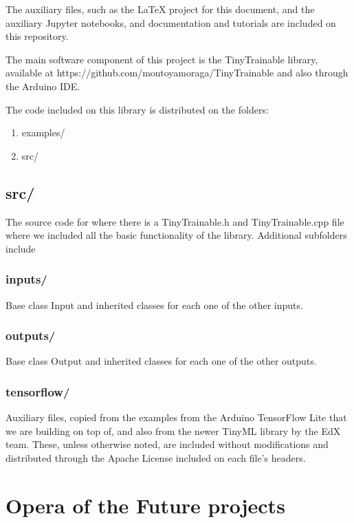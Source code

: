 The auxiliary files, such as the LaTeX project for this document, and the auxiliary Jupyter notebooks, and documentation and tutorials are included on this repository.

The main software component of this project is the TinyTrainable library, available at https://github.com/montoyamoraga/TinyTrainable and also through the Arduino IDE.

The code included on this library is distributed on the folders:

\begin{enumerate}
  \item examples/
  \item src/
\end{enumerate}

\subsection{src/}

The source code for where there is a TinyTrainable.h and TinyTrainable.cpp file where we included all the basic functionality of the library. Additional subfolders include

\subsubsection{inputs/}

Base class Input and inherited classes for each one of the other inputs.

\subsubsection{outputs/}

Base class Output and inherited classes for each one of the other outputs.

\subsubsection{tensorflow/}

Auxiliary files, copied from the examples from the Arduino TensorFlow Lite that we are building on top of, and also from the newer TinyML library by the EdX team. These, unless otherwise noted, are included without modifications and distributed through the Apache License included on each file's headers.

\section{Opera of the Future projects}

